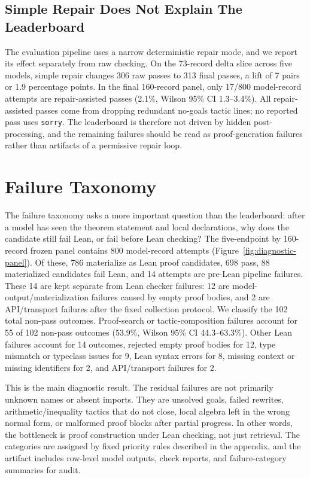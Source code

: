 \documentclass{article}
\begin{document}
\subsection{Simple Repair Does Not Explain The Leaderboard}

The evaluation pipeline uses a narrow deterministic repair mode, and we report
its effect separately from raw checking. On the 73-record delta slice across
five models, simple repair changes 306 raw passes to 313 final passes, a lift
of 7 pairs or 1.9 percentage points. In the final 160-record panel, only
17/800 model-record attempts are repair-assisted passes (2.1\%, Wilson 95\% CI
1.3--3.4\%). All repair-assisted passes come from dropping redundant no-goals
tactic lines; no reported pass uses \texttt{sorry}. The leaderboard is
therefore not driven by hidden post-processing, and the remaining failures
should be read as proof-generation failures rather than artifacts of a
permissive repair loop.




\section{Failure Taxonomy}
\label{sec:failure-taxonomy}

The failure taxonomy asks a more important question than the leaderboard:
after a model has seen the theorem statement and local declarations, why does
the candidate still fail Lean, or fail before Lean checking? The five-endpoint
by 160-record frozen panel contains 800 model-record attempts
(Figure~\ref{fig:diagnostic-panel}). Of these, 786 materialize as Lean proof
candidates, 698 pass, 88 materialized candidates fail Lean, and 14 attempts
are pre-Lean pipeline failures. These 14 are kept separate from Lean checker
failures: 12 are model-output/materialization failures caused by empty proof
bodies, and 2 are API/transport failures after the fixed collection protocol.
We classify the 102 total non-pass outcomes.
Proof-search or tactic-composition failures account for 55 of 102 non-pass
outcomes (53.9\%, Wilson 95\% CI 44.3--63.3\%). Other Lean failures account
for 14 outcomes, rejected empty proof bodies for 12, type mismatch or
typeclass issues for 9, Lean syntax errors for 8, missing context or missing
identifiers for 2, and API/transport failures for 2.

This is the main diagnostic result. The residual failures are not primarily
unknown names or absent imports. They are unsolved goals, failed rewrites,
arithmetic/inequality tactics that do not close, local algebra left in the
wrong normal form, or malformed proof blocks after partial progress. In other
words, the bottleneck is proof construction under Lean checking, not just
retrieval. The categories are assigned by fixed priority rules described in
the appendix, and the artifact includes row-level model outputs, check
reports, and failure-category summaries for audit.
\end{document}
